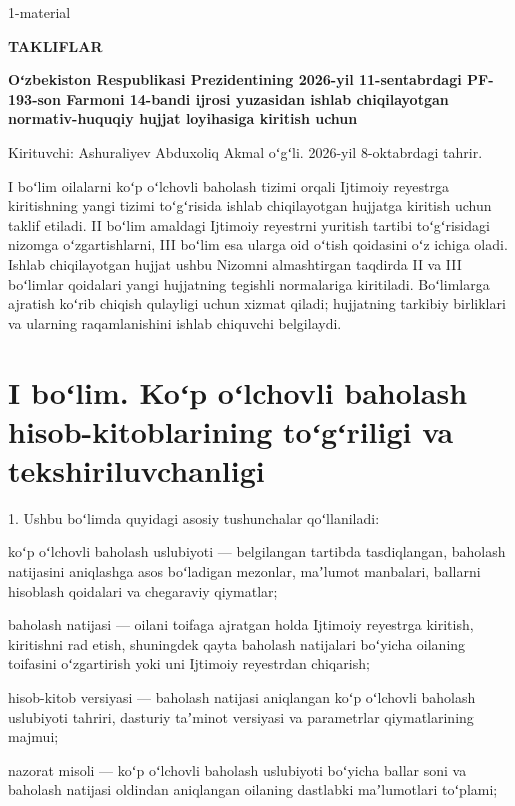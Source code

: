 \documentclass[14pt,a4paper]{extarticle}
\newcommand{\norm}[1]{\par\noindent\hspace*{1.27cm}#1. }
\begin{document}
\begin{flushright}1-material\end{flushright}
\begin{center}\textbf{TAKLIFLAR}\par
\textbf{Oʻzbekiston Respublikasi Prezidentining 2026-yil 11-sentabrdagi PF-193-son Farmoni 14-bandi ijrosi yuzasidan ishlab chiqilayotgan normativ-huquqiy hujjat loyihasiga kiritish uchun}\end{center}

\noindent Kirituvchi: Ashuraliyev Abduxoliq Akmal oʻgʻli. 2026-yil 8-oktabrdagi tahrir.

I boʻlim oilalarni koʻp oʻlchovli baholash tizimi orqali Ijtimoiy reyestrga kiritishning yangi tizimi toʻgʻrisida ishlab chiqilayotgan hujjatga kiritish uchun taklif etiladi. II boʻlim amaldagi Ijtimoiy reyestrni yuritish tartibi toʻgʻrisidagi nizomga oʻzgartishlarni, III boʻlim esa ularga oid oʻtish qoidasini oʻz ichiga oladi. Ishlab chiqilayotgan hujjat ushbu Nizomni almashtirgan taqdirda II va III boʻlimlar qoidalari yangi hujjatning tegishli normalariga kiritiladi. Boʻlimlarga ajratish koʻrib chiqish qulayligi uchun xizmat qiladi; hujjatning tarkibiy birliklari va ularning raqamlanishini ishlab chiquvchi belgilaydi.

\section*{I boʻlim. Koʻp oʻlchovli baholash hisob-kitoblarining toʻgʻriligi va tekshiriluvchanligi}

\norm{1}Ushbu boʻlimda quyidagi asosiy tushunchalar qoʻllaniladi:

koʻp oʻlchovli baholash uslubiyoti — belgilangan tartibda tasdiqlangan, baholash natijasini aniqlashga asos boʻladigan mezonlar, maʼlumot manbalari, ballarni hisoblash qoidalari va chegaraviy qiymatlar;

baholash natijasi — oilani toifaga ajratgan holda Ijtimoiy reyestrga kiritish, kiritishni rad etish, shuningdek qayta baholash natijalari boʻyicha oilaning toifasini oʻzgartirish yoki uni Ijtimoiy reyestrdan chiqarish;

hisob-kitob versiyasi — baholash natijasi aniqlangan koʻp oʻlchovli baholash uslubiyoti tahriri, dasturiy taʼminot versiyasi va parametrlar qiymatlarining majmui;

nazorat misoli — koʻp oʻlchovli baholash uslubiyoti boʻyicha ballar soni va baholash natijasi oldindan aniqlangan oilaning dastlabki maʼlumotlari toʻplami;
\end{document}
